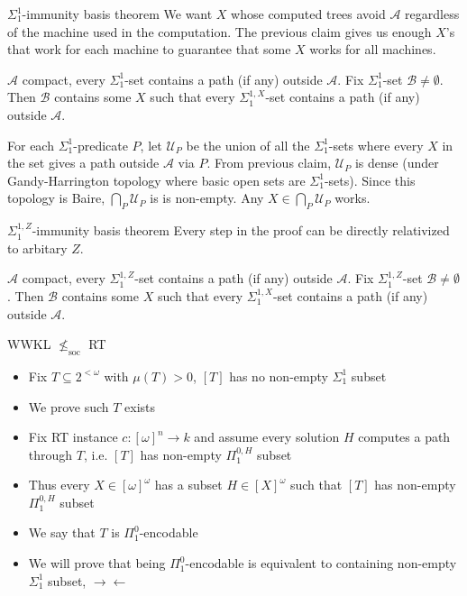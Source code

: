\begin{frame}{$\Sigma_1^1$-immunity basis theorem}
  We want $X$ whose computed trees avoid $\mathcal{A}$ regardless of the
  machine used in the computation. The previous claim gives us enough $X$'s
  that work for each machine to guarantee that some $X$ works for
  all machines.

  \vspace{1em}
  \begin{thm}
    $\mathcal{A}$ compact, every $\Sigma_1^{1}$-set contains a path (if
    any) outside $\mathcal{A}$. Fix $\Sigma_1^{1}$-set
    $\mathcal{B}\neq\emptyset$. Then $\mathcal{B}$ contains some $X$ such
    that every $\Sigma_1^{1,X}$-set contains a path (if any) outside
    $\mathcal{A}$.
  \end{thm}

  \vspace{1em}
  For each $\Sigma_1^1$-predicate $P$, let $\mathcal{U}_P$ be the union of
  all the $\Sigma_1^1$-sets where every $X$ in the set gives a path outside
  $\mathcal{A}$ via $P$. From previous claim, $\mathcal{U}_P$ is dense
  (under Gandy-Harrington topology where basic open sets are
  $\Sigma_1^1$-sets). Since this topology is Baire,
  $\bigcap_P\mathcal{U}_P$ is is non-empty. Any
  $X\in\bigcap_P\mathcal{U}_P$ works.
\end{frame}

\begin{frame}{$\Sigma_1^{1,Z}$-immunity basis theorem}
  Every step in the proof can be directly relativized to arbitary $Z$.
  \vspace{0.5em}
  \begin{thm}
    $\mathcal{A}$ compact, every $\Sigma_1^{1,Z}$-set contains a path
    (if any) outside $\mathcal{A}$. Fix $\Sigma_1^{1,Z}$-set
    $\mathcal{B}\neq\emptyset$. Then $\mathcal{B}$ contains some $X$ such
    that every $\Sigma_1^{1,X}$-set contains a path (if any) outside
    $\mathcal{A}$.
  \end{thm}
\end{frame}

\begin{frame}{WWKL $\nleq_{\text{soc}}$ RT}
  \begin{itemize}
    \item Fix $T\subseteq 2^{<\omega}$ with $\mu(T)>0$, $[T]$
      has no non-empty $\Sigma_1^1$ subset
    \item We prove such $T$ exists
    \item Fix RT instance $c:[\omega]^n\rightarrow k$ and assume every
      solution $H$ computes a path through $T$, i.e. $[T]$ has non-empty
      $\Pi_1^{0,H}$ subset
    \item Thus every $X\in[\omega]^\omega$ has a subset
      $H\in[X]^\omega$ such that $[T]$ has non-empty $\Pi_1^{0,H}$ subset
    \item We say that $T$ is $\Pi_1^0$-encodable
    \item We will prove that being $\Pi_1^0$-encodable is equivalent to
      containing non-empty $\Sigma_1^1$ subset, $\rightarrow\leftarrow$
  \end{itemize}
\end{frame}

